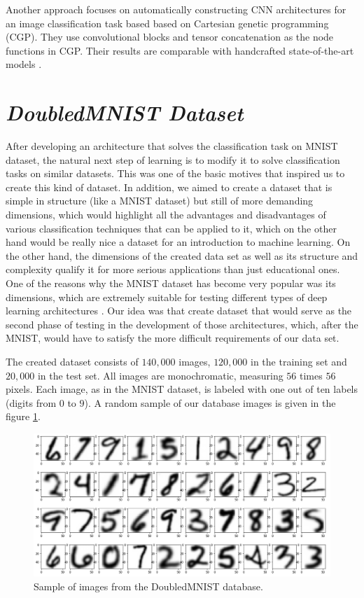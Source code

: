 \documentclass[eng]{simposium}
\begin{document}
Another approach focuses on automatically constructing CNN architectures for an image classification task based based on Cartesian genetic programming (CGP).
They use convolutional blocks and tensor concatenation as the node functions in CGP. Their results are comparable with handcrafted state-of-the-art models \cite{5}.

\section{\textit{DoubledMNIST Dataset}}

After developing an architecture that solves the classification task on MNIST dataset, the natural next step of learning is 
to modify it to solve classification tasks on similar datasets. 
This was one of the basic motives that inspired us to create this kind of dataset. 
In addition, we aimed to create a dataset that is simple in structure (like a MNIST dataset) but still of more demanding 
dimensions, which would highlight all the advantages and disadvantages of various classification techniques that can be 
applied to it, which on the other hand would be really nice a dataset for an introduction to machine learning. 
On the other hand, the dimensions of the created data set as well as its structure and complexity qualify it for more 
serious applications than just educational ones. 
One of the reasons why the MNIST dataset has become very popular was its dimensions, which are extremely suitable for 
testing different types of deep learning architectures \cite{27}. 
Our idea was that create dataset that would serve as the second phase of testing in the development of those architectures, 
which, after the MNIST, would have to satisfy the more difficult requirements of our data set. 

The created dataset consists of $140,000$ images, $120,000$ in the training set and $20,000$ in the test set. 
All images are monochromatic, measuring $56$ times $56$ pixels. 
Each image, as in the MNIST dataset, is labeled with one out of ten labels (digits from $0$ to $9$). 
A random sample of our database images is given in the figure \ref{fig:nist_sample}. 

\begin{figure}[!ht]
  \centering
  \includegraphics[width=1\textwidth]{sample_from_nist.png}
  \caption{Sample of images from the DoubledMNIST database.}
  \label{fig:nist_sample}
\end{figure}
\end{document}
